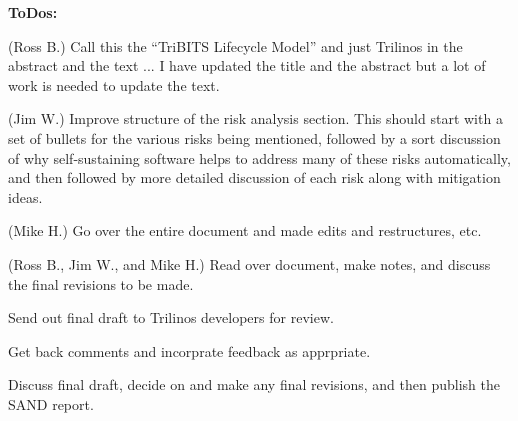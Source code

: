 \documentclass[11pt]{SANDreport}
\begin{document}
{}\textbf{ToDos:}

\begin{compactenum}

{}\item (Ross B.) Call this the ``TriBITS Lifecycle Model'' and just
Trilinos in the abstract and the text ... I have updated the title
and the abstract but a lot of work is needed to update the text.

{}\item (Jim W.) Improve structure of the risk analysis section.  This
should start with a set of bullets for the various risks being mentioned,
followed by a sort discussion of why self-sustaining software helps to
address many of these risks automatically, and then followed by more
detailed discussion of each risk along with mitigation ideas.

{}\item (Mike H.) Go over the entire document and made edits and
restructures, etc.

{}\item (Ross B., Jim W., and Mike H.) Read over document, make notes, and
discuss the final revisions to be made.

{}\item Send out final draft to Trilinos developers for review.

{}\item Get back comments and incorprate feedback as apprpriate.

{}\item Discuss final draft, decide on and make any final revisions, and
then publish the SAND report.

\end{compactenum}

\begin{figure}
\begin{center}
\end{center}
\end{figure}
\end{document}
